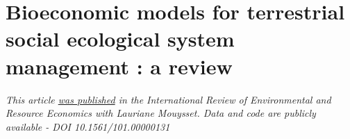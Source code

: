 \chapter{Bioeconomic models for terrestrial social ecological system management : a review}
\label{chapter1}

\textit{This article \href{https://sim-jean.github.io/files/research/jean_mouysset2022.pdf}{was published} in the International Review of Environmental and Resource Economics with Lauriane Mouysset. Data and code are publicly available - DOI 10.1561/101.00000131}